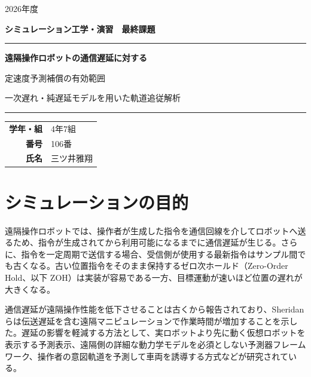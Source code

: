\documentclass[11pt,a4paper]{article}
\begin{document}
\begin{titlepage}
\thispagestyle{empty}
\centering
\vspace*{24mm}
{\sffamily\Large 2026年度\par}
\vspace{5mm}
{\sffamily\bfseries\LARGE シミュレーション工学・演習　最終課題\par}
\vspace{18mm}
{\color{HeadingBlue}\rule{0.82\textwidth}{0.8pt}\par}
\vspace{14mm}
{\sffamily\bfseries\fontsize{21pt}{30pt}\selectfont
遠隔操作ロボットの通信遅延に対する\par
定速度予測補償の有効範囲\par}
\vspace{8mm}
{\large 一次遅れ・純遅延モデルを用いた軌道追従解析\par}
\vspace{14mm}
{\color{HeadingBlue}\rule{0.82\textwidth}{0.8pt}\par}
\vfill
\renewcommand{\arraystretch}{1.5}
\begin{tabular}{>{\sffamily\bfseries}r l}
学年・組 & 4年7組 \\
番号 & 106番 \\
氏名 & 三ツ井雅翔
\end{tabular}
\vspace{22mm}
\end{titlepage}

\setcounter{page}{1}

\section{シミュレーションの目的}

遠隔操作ロボットでは、操作者が生成した指令を通信回線を介してロボットへ送るため、指令が生成されてから利用可能になるまでに通信遅延が生じる。さらに、指令を一定周期で送信する場合、受信側が使用する最新指令はサンプル間でも古くなる。古い位置指令をそのまま保持するゼロ次ホールド（Zero-Order Hold、以下 ZOH）は実装が容易である一方、目標運動が速いほど位置の遅れが大きくなる。

通信遅延が遠隔操作性能を低下させることは古くから報告されており、Sheridanらは伝送遅延を含む遠隔マニピュレーションで作業時間が増加することを示した\cite{sheridan1963}。遅延の影響を軽減する方法として、実ロボットより先に動く仮想ロボットを表示する予測表示\cite{bejczy1990}、遠隔側の詳細な動力学モデルを必須としない予測器フレームワーク\cite{zheng2018,zheng2020}、操作者の意図軌道を予測して車両を誘導する方式\cite{zhang2023}などが研究されている。
\end{document}

